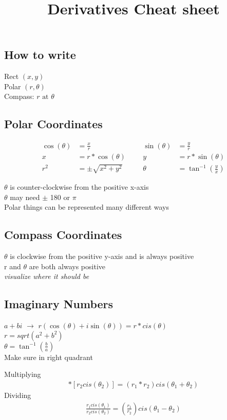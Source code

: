 \documentclass{article}
\title{\vspace{-5ex}Derivatives Cheat sheet  \vspace{-5ex}}
\author{}
\date{}
\begin{document}
	\maketitle{}
	
	\subsection*{How to write}
	Rect $(x, y)$ \\
	Polar $(r, \theta)$ \\
	Compass: $r \text{ at } \theta$
	
	\subsection*{Polar Coordinates}
	
	\begin{align*}
		\cos(\theta) &= \frac{x}{r} && & \sin(\theta) &= \frac{y}{r} \\
		x &= r * \cos(\theta) && & y &= r * \sin(\theta) \\
		r^2 &= \pm \sqrt{x^2 + y^2} & & & \theta &= \tan^{-1}(\frac{y}{x})
	\end{align*}

	\noindent $\theta$ is counter-clockwise from the positive x-axis \\
	$\theta$ may need $\pm$ 180 or $\pi$  \\
	Polar things can be represented many different ways
	
	\subsection*{Compass Coordinates}
	$\theta$ is clockwise from the positive y-axis and is always positive \\
	r and $\theta$ are both always positive \\
	\emph{visualize where it should be}
	
	\subsection*{Imaginary Numbers}
	$a+bi$ $\rightarrow$ $r(\cos(\theta)+i\sin(\theta)) = r*cis(\theta)$ \\
	\indent $r = sqrt(a^2+b^2)$ \\
	\indent $\theta = \tan^{-1}(\frac{b}{a})$ \\
	\indent \indent Make sure in right quadrant
	
	\noindent Multiplying
	\begin{align*}
		[r_1 cis(\theta_1)] * [r_2 cis(\theta_2)] = (r_1*r_2) cis(\theta_1+\theta_2)
	\end{align*}
	Dividing
	\begin{align*}
		\frac{r_1 cis(\theta_1)}{ r_2 cis(\theta_2)} = (\frac{r_1}{r_2}) cis(\theta_1-\theta_2)
	\end{align*}
\end{document}
